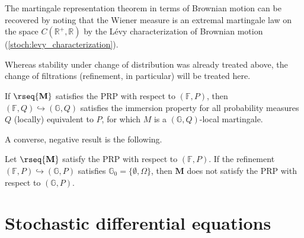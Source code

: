     \begin{remark}
        The martingale representation theorem in terms of Brownian motion can be recovered by noting that the Wiener measure is an extremal martingale law on the space $C(\mathbb{R}^+,\mathbb{R})$ by the L\'evy characterization of Brownian motion (\cref{stoch:levy_characterization}).
    \end{remark}

    Whereas stability under change of distribution was already treated above, the change of filtrations (refinement, in particular) will be treated here.

    \begin{property}\label{stoch:prp_refinement}
        If $\rseq{\mathbf{M}}$ satisfies the PRP with respect to $(\mathbb{F},P)$, then $(\mathbb{F},Q)\hookrightarrow(\mathbb{G},Q)$ satisfies the immersion property for all probability measures $Q$ (locally) equivalent to $P$, for which $M$ is a $(\mathbb{G},Q)$-local martingale.
    \end{property}

    A converse, negative result is the following.
    \begin{property}
        Let $\rseq{\mathbf{M}}$ satisfy the PRP with respect to $(\mathbb{F},P)$. If the refinement $(\mathbb{F},P)\hookrightarrow(\mathbb{G},P)$ satisfies $\mathbb{G}_0=\{\emptyset,\Omega\}$, then $\mathbf{M}$ does not satisfy the PRP with respect to $(\mathbb{G},P)$.
    \end{property}

\section{Stochastic differential equations}

